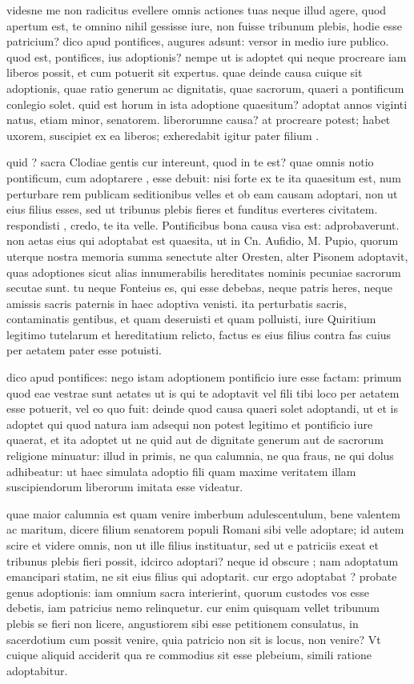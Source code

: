  videsne me non radicitus evellere omnis actiones tuas neque illud agere, quod apertum est, te omnino nihil gessisse iure, non fuisse tribunum plebis, hodie esse patricium? dico apud pontifices, augures adsunt: versor in medio iure publico. quod est, pontifices, ius adoptionis? nempe ut is adoptet qui neque procreare iam liberos possit, et cum potuerit sit expertus. quae deinde causa cuique sit adoptionis, quae ratio generum ac dignitatis, quae sacrorum, quaeri a pontificum conlegio solet. quid est horum in ista adoptione quaesitum? adoptat annos viginti natus, etiam minor, senatorem. liberorumne causa? at procreare potest; habet uxorem, suscipiet ex ea liberos; exheredabit igitur pater filium .

 quid ? sacra Clodiae gentis cur intereunt, quod in te est? quae omnis notio pontificum, cum adoptarere , esse debuit: nisi forte ex te ita quaesitum est, num perturbare rem publicam seditionibus velles et ob eam causam adoptari, non ut eius filius esses, sed ut tribunus plebis fieres et funditus everteres civitatem. respondisti , credo, te ita velle. Pontificibus bona causa visa est: adprobaverunt. non aetas eius qui adoptabat est quaesita, ut in Cn. Aufidio, M. Pupio, quorum uterque nostra memoria summa senectute alter Oresten, alter Pisonem adoptavit, quas adoptiones sicut alias innumerabilis hereditates nominis pecuniae sacrorum secutae sunt. tu neque Fonteius es, qui esse debebas, neque patris heres, neque amissis sacris paternis in haec adoptiva venisti. ita perturbatis sacris, contaminatis gentibus, et quam deseruisti et quam polluisti, iure Quiritium legitimo tutelarum et hereditatium relicto, factus es eius filius contra fas cuius per aetatem pater esse potuisti.

 dico apud pontifices: nego istam adoptionem pontificio iure esse factam: primum quod eae vestrae sunt aetates ut is qui te adoptavit vel fili tibi loco per aetatem esse potuerit, vel eo quo fuit: deinde quod causa quaeri solet adoptandi, ut et is adoptet qui quod natura iam adsequi non potest legitimo et pontificio iure quaerat, et ita adoptet ut ne quid aut de dignitate generum aut de sacrorum religione minuatur: illud in primis, ne qua calumnia, ne qua fraus, ne qui dolus adhibeatur: ut haec simulata adoptio fili quam maxime veritatem illam suscipiendorum liberorum imitata esse videatur.

 quae maior calumnia est quam venire imberbum adulescentulum, bene valentem ac maritum, dicere filium senatorem populi Romani sibi velle adoptare; id autem scire et videre omnis, non ut ille filius instituatur, sed ut e patriciis exeat et tribunus plebis fieri possit, idcirco adoptari? neque id obscure ; nam adoptatum emancipari statim, ne sit eius filius qui adoptarit. cur ergo adoptabat ? probate genus adoptionis: iam omnium sacra interierint, quorum custodes vos esse debetis, iam patricius nemo relinquetur. cur enim quisquam vellet tribunum plebis se fieri non licere, angustiorem sibi esse petitionem consulatus, in sacerdotium cum possit venire, quia patricio non sit is locus, non venire? Vt cuique aliquid acciderit qua re commodius sit esse plebeium, simili ratione adoptabitur.

